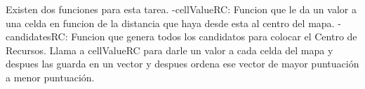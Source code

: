 Existen dos funciones para esta tarea.
-cellValueRC: Funcion que le da un valor a una celda en funcion de la distancia que haya desde esta al centro del mapa.
-candidatesRC: Funcion que genera todos los candidatos para colocar el Centro de Recursos.
Llama a cellValueRC para darle un valor a cada celda del mapa y despues las guarda en un vector y despues ordena ese vector de mayor puntuación a menor puntuación.

